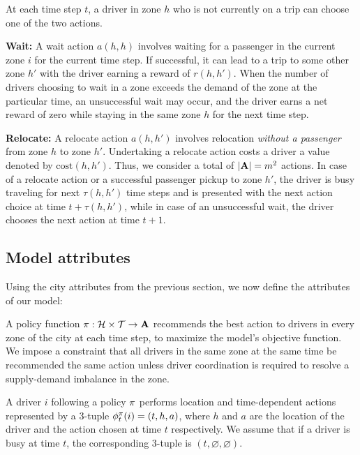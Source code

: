 At each time step $t$, a driver in zone $h$ who is not currently on a
trip can choose one of the two actions.
\squishlist
    \item \textbf{Wait:} A wait action $a(h,h)$ involves waiting for a
            passenger in the current zone $i$ for the current time step. 
            If successful, it can lead to a trip to some other zone $h'$
            with the driver earning a reward of $r(h, h')$.  
        When the number of
            drivers choosing to wait in a zone exceeds the demand of the zone at
            the particular time, an unsuccessful wait may occur, and the driver earns
            a net reward of zero while staying in the same zone $h$ for the next time
            step.
    \item \textbf{Relocate:} A relocate action $a(h,h')$ involves
            relocation {\em without a passenger} from zone $h$ to zone $h'$. 
        Undertaking a relocate action costs a driver a value denoted 
            by $\textrm{cost}(h, h')$.
\squishend
Thus, we consider a total of $|{{\mathbf{A}}}| = m^2$ actions.  
In case of a relocate action or a successful passenger pickup to zone $h'$, 
    the driver is busy traveling for next $\tau(h, h')$ time steps and is 
    presented with the next action choice at time $t + \tau(h, h')$, 
    while in case of an unsuccessful wait, the driver chooses the next action 
    at time $t + 1$.

\subsection{Model attributes}

Using the city attributes from the previous section, we now define the
    attributes of our model:

A policy function ${{\pi}} : {{\mathcal{H}}} \times {{\ensuremath{\mathcal{T}}}} \rightarrow {{\ensuremath{\mathbf{A}}}}$ 
    recommends the best action to drivers in every zone of the city at each time step,
    to maximize the model's objective function.  
We impose a constraint that all drivers in the same zone at the same time be 
    recommended the same action unless driver coordination is required to 
    resolve a supply-demand imbalance in the zone.  

A driver $i$ following a policy ${{\pi}}$ performs location 
    and time-dependent actions represented by a 3-tuple 
    $\phi^{{{\pi}}}_t(i) = (t, h, a)$, where $h$ and $a$ are the location of the driver
    and the action chosen at time $t$ respectively.
We assume that if a driver is busy at time $t$, the corresponding 3-tuple 
    is $(t, \varnothing,\varnothing)$.

